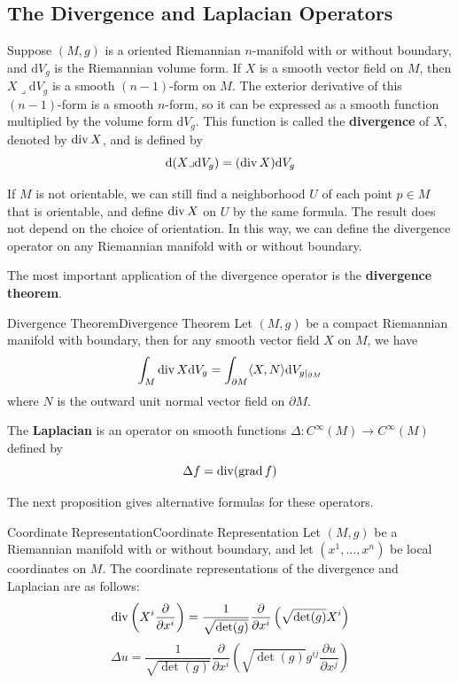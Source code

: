 \documentclass[../main.tex]{subfiles}
\begin{document}
\subsection{The Divergence and Laplacian Operators}
Suppose $(M, g)$ is a oriented Riemannian $n$-manifold with or without boundary, and $\mathrm{d} V_g$ is the Riemannian volume form. If $X$ is a smooth vector field on $M$, then $X \lrcorner \mathrm{d} V_g$ is a smooth $(n-1)$-form on $M$. The exterior derivative of this $(n-1)$-form is a smooth $n$-form, so it can be expressed as a smooth function multiplied by the volume form $\mathrm{d} V_g$. This function is called the \textbf{divergence} of $X$, denoted by $\operatorname{div} X$, and is defined by
\begin{equation}
	\mathrm{d} (X \lrcorner \mathrm{d} V_g) = (\operatorname{div} X) \mathrm{d} V_g
\end{equation}

If $M$ is not orientable, we can still find a neighborhood $U$ of each point $p \in M$ that is orientable, and define $\operatorname{div} X$ on $U$ by the same formula. The result does not depend on the choice of orientation. In this way, we can define the divergence operator on any Riemannian manifold with or without boundary.

The most important application of the divergence operator is the \textbf{divergence theorem}.
\begin{theorem}{Divergence Theorem}{Divergence Theorem}
	Let $(M, g)$ be a compact Riemannian manifold with boundary, then for any smooth vector field $X$ on $M$, we have
	\begin{equation}
		\int_M \operatorname{div} X \mathrm{d} V_g = \int_{\partial M} \langle X, N \rangle \mathrm{d} V_{g|_{\partial M}}
	\end{equation}
	where $N$ is the outward unit normal vector field on $\partial M$.
\end{theorem}

The \textbf{Laplacian} is an operator on smooth functions $\Delta: C^\infty(M) \to C^\infty(M)$ defined by
\begin{equation}
	\Delta f = \operatorname{div}(\operatorname{grad} f)
\end{equation}

The next proposition gives alternative formulas for these operators.

\begin{proposition}{Coordinate Representation}{Coordinate Representation}
	Let $(M, g)$ be a Riemannian manifold with or without boundary, and let $(x^1, \ldots, x^n)$ be local coordinates on $M$. The coordinate representations of the divergence and Laplacian are as follows:
	\begin{equation}
		\operatorname{div} \left(X^i \frac{\partial}{\partial x^i}\right) = \frac{1}{\sqrt{\det(g)}} \frac{\partial}{\partial x^i} \left(\sqrt{\det(g)} X^i\right)
	\end{equation}
	\begin{equation}
		\Delta u = \frac{1}{\sqrt{\det(g)}} \frac{\partial}{\partial x^i} \left(\sqrt{\det(g)} g^{ij} \frac{\partial u}{\partial x^j}\right)
	\end{equation}
\end{proposition}
\end{document}
